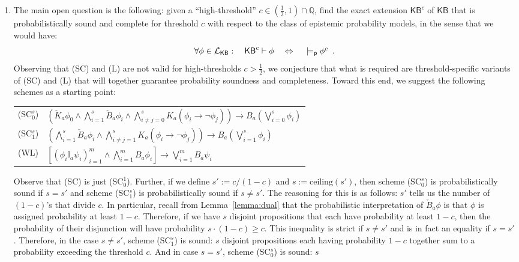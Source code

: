 \documentclass[12pt]{article}
\theoremstyle{definition}
\newcommand{\Rat}{\mathbb{Q}}  %
\newcommand{\Lang}{{\cal L}}   %
\newcommand{\KB}{{\mathsf{KB}}}                        %
\newcommand{\modelsp}{\models_{\mathsf{p}}}                  %
\begin{document}
\begin{enumerate}
\item
The main open question is the following: given a ``high-threshold''
$c\in(\frac 12,1)\cap\Rat$, find the exact extension $\KB^c$ of $\KB$ that is
probabilistically sound and complete for threshold $c$ with respect to
the class of epistemic probability models, in the sense that we would have:
\[
\textstyle 
\forall\phi\in\Lang_\KB:\quad
\KB^c\vdash\phi
\quad\Leftrightarrow\quad
{}\modelsp\phi^c \enspace.
\]
Observing that (SC) and (L) are not valid for high-thresholds $c>\frac
12$, we conjecture that what is required are threshold-specific
variants of (SC) and (L) that will together guarantee probability
soundness and completeness.  Toward this end, we suggest the following
schemes as a starting point:
\begin{center}
  \renewcommand{\arraystretch}{1.3}
  \begin{tabular}[t]{cl}
    (SC$_0^s$) &
    $\textstyle(\check K_a\phi_0\land
    \bigwedge_{i=1}^s\check B_a\phi_i\land
    \bigwedge_{i\neq j=0}^s K_a(\phi_i\to\lnot \phi_j))\to 
    B_a(\bigvee_{i=0}^s \phi_i)$
    \\
    (SC$_1^s$) &
    $\textstyle(\bigwedge_{i=1}^s\check B_a\phi_i\land
    \bigwedge_{i\neq j=1}^s K_a(\phi_i\to\lnot \phi_j))
    \to B_a(\bigvee_{i=1}^s \phi_i)$
    \\
    (WL) &
    $\textstyle [(\phi_i\mathbb{I}_a\psi_i)_{i=1}^m
    \land \bigwedge_{i=1}^m B_a\phi_i] \to
    \bigvee_{i=1}^m B_a\psi_i$
  \end{tabular}
\end{center}
Observe that (SC) is just (SC$_0^1$).  Further, if we define
$s':=c/(1-c)$ and $s:=\text{ceiling}(s')$, then scheme (SC$_0^s$) is
probabilistically sound if $s=s'$ and scheme (SC$_1^s$) is
probabilistically sound if $s\neq s'$.  The reasoning for this is as
follows: $s'$ tells us the number of $(1-c)$'s that divide $c$.  In
particular, recall from Lemma~\ref{lemma:dual} that the probabilistic
interpretation of $\check B_a\phi$ is that $\phi$ is assigned
probability at least $1-c$.  Therefore, if we have $s$ disjoint
propositions that each have probability at least $1-c$, then the
probability of their disjunction will have probability
$s\cdot(1-c)\geq c$.  This inequality is strict if $s\neq s'$ and is
in fact an equality if $s=s'$.  Therefore, in the case $s\neq s'$,
scheme (SC$_1^s$) is sound: $s$ disjoint propositions each having
probability $1-c$ together sum to a probability exceeding the
threshold $c$.  And in case $s=s'$, scheme (SC$_0^s$) is sound: $s$

\end{enumerate}
\end{document}
